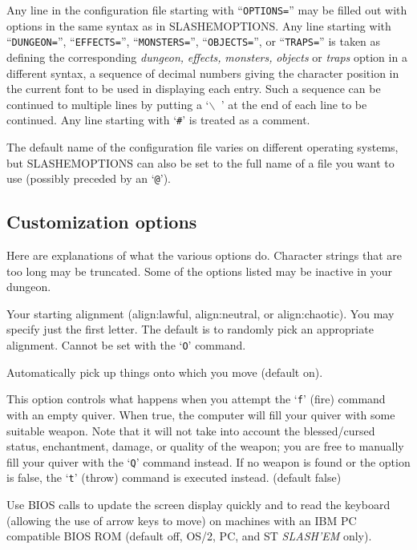 Any line in the configuration file starting with ``{\tt OPTIONS=}'' may be
filled out with options in the same syntax as in SLASHEMOPTIONS.
Any line starting with ``{\tt DUNGEON=}'', ``{\tt EFFECTS=}'', ``{\tt MONSTERS=}'',
``{\tt OBJECTS=}'', or ``{\tt TRAPS=}''
is taken as defining the corresponding
{\it dungeon,\/} 
{\it effects,\/} 
{\it monsters,\/} 
{\it objects\/} 
or
{\it traps\/} 
option in a different syntax,
a sequence of decimal numbers giving the character position
in the current font to be used in displaying each entry.
Such a sequence can be continued to multiple lines by putting a `{\tt $\backslash$ }'
at the end of each line to be continued.
Any line starting with `{\tt \#}' is treated as a comment.

The default name of the configuration file varies on different
operating systems, but SLASHEMOPTIONS can also be set to
the full name of a file you want to use (possibly preceded by an `{\tt @}').
\subsection*{Customization options}


Here are explanations of what the various options do.
Character strings that are too long may be truncated.
Some of the options listed may be inactive in your dungeon.
\blist{}

\item[\ib{align}]
Your starting alignment (align:lawful, align:neutral,
or align:chaotic).  You may specify just the first letter.
The default is to randomly pick an appropriate alignment.
Cannot be set with the `{\tt O}' command.

\item[\ib{autopickup}]
Automatically pick up things onto which you move (default on).

\item[\ib{autoquiver}]
This option controls what happens when you attempt the `{\tt f}' (fire)
command with an empty quiver.  When true, the computer will fill
your quiver with some suitable weapon.  Note that it will not take
into account the blessed/cursed status, enchantment, damage, or
quality of the weapon; you are free to manually fill your quiver with
the `{\tt Q}' command instead.  If no weapon is found or the option is
false, the `{\tt t}' (throw) command is executed instead.  (default false)

\item[\ib{BIOS}]
Use BIOS calls to update the screen
display quickly and to read the keyboard (allowing the use of arrow
keys to move) on machines with an IBM PC compatible BIOS ROM (default off,
OS/2, PC, and ST {\it SLASH'EM\/} only).

